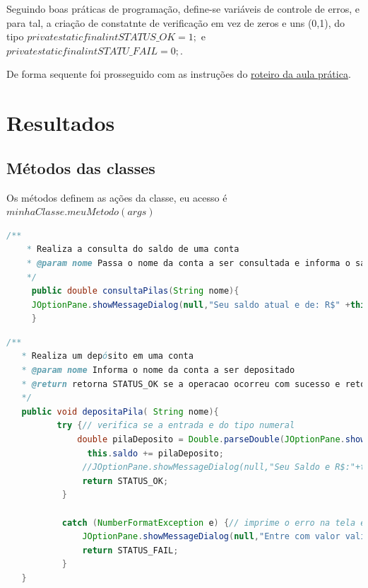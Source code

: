 \par Seguindo boas práticas de programação, define-se variáveis de controle de erros, e para tal, a criação de constatnte de verificação em vez de zeros e uns (0,1), do tipo $private static final int  STATUS\_OK = 1;$ e $private static final int STATU\_FAIL = 0;$.
\par De forma sequente foi prosseguido com as instruções do \href{https://github.com/OgliariNatan/gerenciaBanco/blob/main/Aula%20pr%C3%A1tica.pdf}{roteiro da aula prática}.

\section{Resultados}






\subsection{Métodos das classes}

\par Os métodos definem as ações da classe, eu acesso é $minhaClasse.meuMetodo(args)$

\begin{lstlisting}[language=Java, caption=consultaPilas, label=consultaPilas]
    /**
    * Realiza a consulta do saldo de uma conta
    * @param nome Passa o nome da conta a ser consultada e informa o saldo ao cliente.
    */
     public double consultaPilas(String nome){
     JOptionPane.showMessageDialog(null,"Seu saldo atual e de: R$" +this.saldo, this.nome+" "+this.sobrenome, JOptionPane.INFORMATION_MESSAGE, icon);
     }

\end{lstlisting}

\begin{lstlisting}[language=Java, caption=depositoPilas, label=depositaPilas]
  /**
   * Realiza um depósito em uma conta
   * @param nome Informa o nome da conta a ser depositado
   * @return retorna STATUS_OK se a operacao ocorreu com sucesso e retorna STATUS_FAIL se ocorrer um erro
   */
   public void depositaPila( String nome){
          try {// verifica se a entrada e do tipo numeral
              double pilaDeposito = Double.parseDouble(JOptionPane.showInputDialog(null,"Informe a quantidade em Reais (R$) a ser depositado na conta do "+this.nome+" "+this.sobrenome));
                this.saldo += pilaDeposito;
               //JOptionPane.showMessageDialog(null,"Seu Saldo e R$:"+this.consultaPilas(this.nome)+" Reais", this.nome, JOptionPane.INFORMATION_MESSAGE, icon);
               return STATUS_OK;
           }

           catch (NumberFormatException e) {// imprime o erro na tela e informa o que foi digitado.
               JOptionPane.showMessageDialog(null,"Entre com valor valido, do tipo numeral.\n Use (.) ponto em vez de (,) virgula\n ERRO: " + e.getMessage()  , "ERRO", JOptionPane.ERROR_MESSAGE);
               return STATUS_FAIL;
           }
   }
\end{lstlisting}




